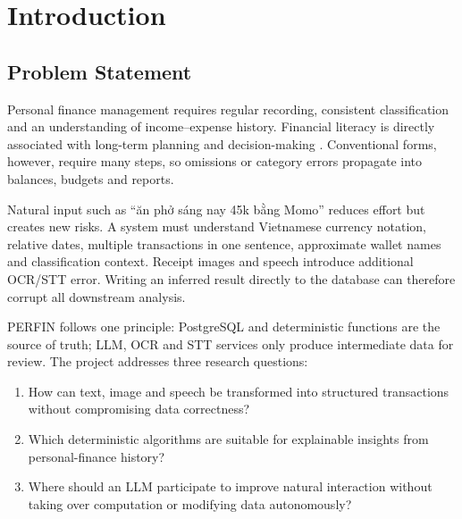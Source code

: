 \chapter{Introduction}
\label{chap:introduction}

\section{Problem Statement}

Personal finance management requires regular recording, consistent classification and an understanding of income--expense history. Financial literacy is directly associated with long-term planning and decision-making \cite{lusardi2014}. Conventional forms, however, require many steps, so omissions or category errors propagate into balances, budgets and reports.

Natural input such as ``ăn phở sáng nay 45k bằng Momo'' reduces effort but creates new risks. A system must understand Vietnamese currency notation, relative dates, multiple transactions in one sentence, approximate wallet names and classification context. Receipt images and speech introduce additional OCR/STT error. Writing an inferred result directly to the database can therefore corrupt all downstream analysis.

PERFIN follows one principle: PostgreSQL and deterministic functions are the source of truth; LLM, OCR and STT services only produce intermediate data for review. The project addresses three research questions:

\begin{enumerate}
  \item How can text, image and speech be transformed into structured transactions without compromising data correctness?
  \item Which deterministic algorithms are suitable for explainable insights from personal-finance history?
  \item Where should an LLM participate to improve natural interaction without taking over computation or modifying data autonomously?
\end{enumerate}


